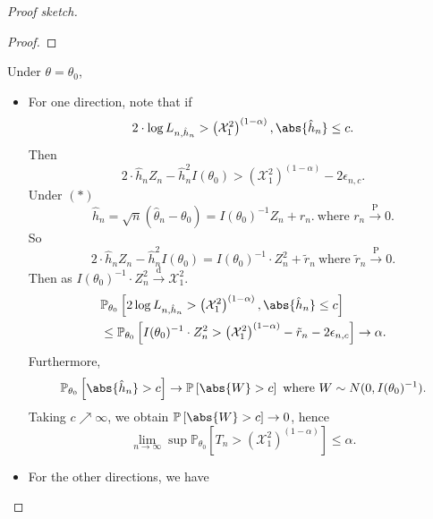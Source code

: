 \documentclass[a4paper]{article}
\begin{document}
\begin{itemize}[leftmargin=*]
\begin{proof}[Proof sketch]
\begin{proof}
		\end{proof}
		Under $\theta = \theta_0$,
		\begin{itemize}[leftmargin=*]
			\item For one direction, note that if
			\begin{equation*}
				2 \cdot \log L_{n,\hat{h}_n} > \left(\mathcal{X}_1^2\right)^{(1-\alpha)}, \abs{\hat{h}_n} \leq c.
			\end{equation*}
			Then
			\begin{equation*}
				2 \cdot \hat{h}_n Z_n - \hat{h}_n^2 I(\theta_0) > \left(\mathcal{X}_1^2\right)^{(1-\alpha)} - 2 \epsilon_{n,c}.
			\end{equation*}
			Under $(\ast)$
			\begin{equation*}
				\hat{h}_n = \sqrt{n} (\hat{\theta}_n - \theta_0) = I(\theta_0)^{-1} Z_n + r_n. \ \text{where } r_n \stackrel{\text{P}}{\longrightarrow} 0.
			\end{equation*}
			So
			\begin{equation*}
				2 \cdot \hat{h}_n Z_n - \hat{h}_n^2 I(\theta_0) = I(\theta_0)^{-1} \cdot Z_n^2 + \tilde{r}_n \ \text{where } \tilde{r}_n \stackrel{\text{P}}{\longrightarrow} 0.
			\end{equation*}
			Then as $I(\theta_0)^{-1} \cdot Z_n^2 \stackrel{\text{d}}{\longrightarrow} \mathcal{X}_1^2$.
			\begin{equation*}
				\begin{aligned}
					& \mathbb{P}_{\theta_0} \left[2 \log L_{n,\hat{h}_n} > \left(\mathcal{X}_1^2\right)^{(1-\alpha)}, \abs{\hat{h}_n} \leq c \right] \\
					& \leq \mathbb{P}_{\theta_0} \left[I(\theta_0)^{-1} \cdot Z_n^2 > \left(\mathcal{X}_1^2\right)^{(1-\alpha)} - \tilde{r}_n - 2\epsilon_{n,c}\right] \to \alpha.
				\end{aligned}
			\end{equation*}
			Furthermore,
			\begin{equation*}
				\mathbb{P}_{\theta_0} \left[\abs{\hat{h}_n} > c\right] \to \mathbb{P} \left[\abs{W} > c\right] \ \text{where } W \sim N(0,I(\theta_0)^{-1}).
			\end{equation*}
			Taking $c \nearrow \infty$, we obtain $\mathbb{P} \left[\abs{W} > c\right] \to 0$, hence
			\begin{equation*}
				\lim\limits_{n \to \infty} \sup \mathbb{P}_{\theta_0} \left[T_n > \left(\mathcal{X}_1^2\right)^{(1-\alpha)}\right] \leq \alpha.
			\end{equation*}
			\item For the other directions, we have

\end{itemize}
\end{proof}
\end{itemize}
\end{document}
